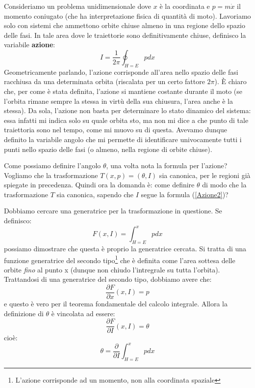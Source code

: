 \documentclass[a4paper,openany]{article}
\begin{document}
	Consideriamo un problema unidimensionale dove $x$ è la coordinata e $p = m\dot{x}$ il momento coniugato (che ha interpretazione fisica di quantità di moto). Lavoriamo solo con sistemi che ammettono orbite chiuse almeno in una regione dello spazio delle fasi. In tale area dove le traiettorie sono definitivamente chiuse, definisco la variabile \textbf{azione}:
	\begin{equation}
		I = \dfrac{1}{2\pi}\oint_{H=E}pdx
		\label{Azione2}
	\end{equation}
	Geometricamente parlando, l'azione corrisponde all'area nello spazio delle fasi racchiusa da una determinata orbita (riscalata per un certo fattore $2\pi$). È chiaro che, per come è stata definita, l'azione si mantiene costante durante il moto (se l'orbita rimane sempre la stessa in virtù della sua chiusura, l'area anche è la stessa). Da sola, l'azione non basta per determinare lo stato dinamico del sistema: essa infatti mi indica solo su quale orbita sto, ma non mi dice a che punto di tale traiettoria sono nel tempo, come mi muovo su di questa. Avevamo dunque definito la variabile angolo che mi permette di identificare univocamente tutti i punti nello spazio delle fasi (o almeno, nella regione di orbite chiuse). 
	
	Come possiamo definire l'angolo $\theta$, una volta nota la formula per l'azione? Vogliamo che la trasformazione $T(x,p) = (\theta, I)$ sia canonica, per le regioni già spiegate in precedenza. Quindi ora la domanda è: come definire $\theta$ di modo che la trasformazione $T$ sia canonica, sapendo che $I$ segue la formula (\ref{Azione2})?
	
	Dobbiamo cercare una generatrice per la trasformazione in questione. Se definisco:
	$$
	F(x,I) = \int_{H=E}^{x}pdx
	$$
	possiamo dimostrare che questa è proprio la generatrice cercata. Si tratta di una funzione generatrice del secondo tipo\footnote{L'azione corrisponde ad un momento, non alla coordinata spaziale} che è definita come l'area sottesa delle orbite \textit{fino} al punto x (dunque non chiudo l'intregrale su tutta l'orbita). Trattandosi di una generatrice del secondo tipo, dobbiamo avere che:
	\begin{equation}\label{key}
		\dfrac{\partial F}{\partial x}(x,I) = p
	\end{equation}
	e questo è vero per il teorema fondamentale del calcolo integrale. Allora la definizione di $\theta$ è vincolata ad essere:
	\begin{equation}\label{key}
		\dfrac{\partial F}{\partial I}(x,I) = \theta
	\end{equation}
	cioè:
	\begin{equation}\label{key}
		\theta = \dfrac{\partial}{\partial I}\int_{H=E}^{x}pdx
	\end{equation}
	
\end{document}
